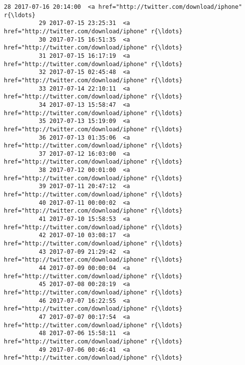 \documentclass[11pt]{article}
\begin{document}
\begin{Verbatim}[commandchars=\\\{\}]
          28 2017-07-16 20:14:00  <a href="http://twitter.com/download/iphone" r{\ldots}   
          29 2017-07-15 23:25:31  <a href="http://twitter.com/download/iphone" r{\ldots}   
          30 2017-07-15 16:51:35  <a href="http://twitter.com/download/iphone" r{\ldots}   
          31 2017-07-15 16:17:19  <a href="http://twitter.com/download/iphone" r{\ldots}   
          32 2017-07-15 02:45:48  <a href="http://twitter.com/download/iphone" r{\ldots}   
          33 2017-07-14 22:10:11  <a href="http://twitter.com/download/iphone" r{\ldots}   
          34 2017-07-13 15:58:47  <a href="http://twitter.com/download/iphone" r{\ldots}   
          35 2017-07-13 15:19:09  <a href="http://twitter.com/download/iphone" r{\ldots}   
          36 2017-07-13 01:35:06  <a href="http://twitter.com/download/iphone" r{\ldots}   
          37 2017-07-12 16:03:00  <a href="http://twitter.com/download/iphone" r{\ldots}   
          38 2017-07-12 00:01:00  <a href="http://twitter.com/download/iphone" r{\ldots}   
          39 2017-07-11 20:47:12  <a href="http://twitter.com/download/iphone" r{\ldots}   
          40 2017-07-11 00:00:02  <a href="http://twitter.com/download/iphone" r{\ldots}   
          41 2017-07-10 15:58:53  <a href="http://twitter.com/download/iphone" r{\ldots}   
          42 2017-07-10 03:08:17  <a href="http://twitter.com/download/iphone" r{\ldots}   
          43 2017-07-09 21:29:42  <a href="http://twitter.com/download/iphone" r{\ldots}   
          44 2017-07-09 00:00:04  <a href="http://twitter.com/download/iphone" r{\ldots}   
          45 2017-07-08 00:28:19  <a href="http://twitter.com/download/iphone" r{\ldots}   
          46 2017-07-07 16:22:55  <a href="http://twitter.com/download/iphone" r{\ldots}   
          47 2017-07-07 00:17:54  <a href="http://twitter.com/download/iphone" r{\ldots}   
          48 2017-07-06 15:58:11  <a href="http://twitter.com/download/iphone" r{\ldots}   
          49 2017-07-06 00:46:41  <a href="http://twitter.com/download/iphone" r{\ldots}   
          

\end{Verbatim}
\end{document}
